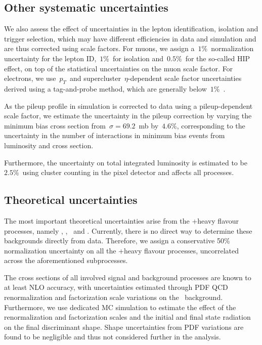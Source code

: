 \subsection{Other systematic uncertainties}
We also assess the effect of uncertainties in the lepton identification, isolation and trigger selection, which may have different efficiencies in data and simulation and are thus corrected using scale factors. For muons, we assign a~$1\%$~normalization uncertainty for the lepton ID,~$1\%$~for isolation and~$0.5\%$~for the so-called HIP effect, on top of the statistical uncertainties on the muon scale factor\cite{CMS:2017_mu_sf}. For electrons, we use~$p_T$~and supercluster~$\eta$-dependent scale factor uncertainties derived using a tag-and-probe method, which are generally below~$1\%$~\cite{CMS:2017_ele_sf}.

As the pileup profile in simulation is corrected to data using a pileup-dependent scale factor, we estimate the uncertainty in the pileup correction by varying the minimum bias cross section from~$\sigma = 69.2$~mb by~$4.6\%$, corresponding to the uncertainty in the number of interactions in minimum bias events from luminosity and cross section\cite{CMS:2017_pu_weight_twiki}.

Furthermore, the uncertainty on total integrated luminosity is estimated to be~$2.5\%$~using cluster counting in the pixel detector and affects all processes\cite{CMS:2017sdi,CMS:2017_lumi}.

\subsection{Theoretical uncertainties}
The most important theoretical uncertainties arise from the \ttbar+heavy flavour processes, namely \ttbb, \tttwob, \ttb~and \ttcc. Currently, there is no direct way to determine these backgrounds directly from data. Therefore, we assign a conservative 50\% normalization uncertainty on all the \ttbar+heavy flavour processes, uncorrelated across the aforementioned subprocesses.

The cross sections of all involved signal and background processes are known to at least NLO accuracy, with uncertainties estimated through PDF QCD renormalization and factorization scale variations on the \ttbar~background. Furthermore, we use dedicated MC simulation to estimate the effect of the renormalization and factorization scales and the initial and final state radiation on the final discriminant shape. Shape uncertainties from PDF variations are found to be negligible and thus not considered further in the analysis.


